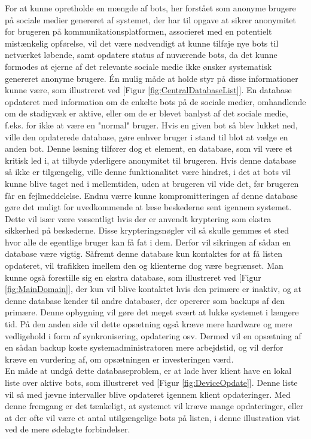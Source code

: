 For at kunne opretholde en mængde af bots, her forstået som anonyme brugere på sociale medier genereret af systemet, der har til opgave at sikrer anonymitet for brugeren på kommunikationsplatformen, associeret med en potentielt mistænkelig opførelse, vil det være nødvendigt at kunne tilføje nye bots til netværket løbende, samt opdatere status af nuværende bots, da det kunne formodes at ejerne af det relevante sociale medie ikke ønsker systematisk genereret anonyme brugere. Én mulig måde at holde styr på disse informationer kunne være, som illustreret ved [Figur \ref{fig:CentralDatabaseList}]. En database opdateret med information om de enkelte bots på de sociale medier, omhandlende om de stadigvæk er aktive, eller om de er blevet banlyst af det sociale medie, f.eks. for ikke at være en "normal" bruger. Hvis en given bot så blev lukket ned, ville den opdaterede database, gøre enhver bruger i stand til blot at vælge en anden bot. Denne løsning tilfører dog et element, en database, som vil være et kritisk led i, at tilbyde yderligere anonymitet til brugeren. Hvis denne database så ikke er tilgængelig, ville denne funktionalitet være hindret, i det at bots vil kunne blive taget ned i mellemtiden, uden at brugeren vil vide det, før brugeren får en fejlmeddelelse. Endnu værre kunne kompromitteringen af denne database gøre det muligt for uvedkommende at læse beskederne sent igennem systemet. Dette vil især være væsentligt hvis der er anvendt kryptering som ekstra sikkerhed på beskederne. Disse krypteringsnøgler vil så skulle gemmes et sted hvor alle de egentlige bruger kan få fat i dem. Derfor vil sikringen af sådan en database være vigtig. Såfremt denne database kun kontaktes for at få listen opdateret, vil trafikken imellem den og klienterne dog være begrænset. Man kunne også forestille sig en ekstra database, som illustreret ved [Figur \ref{fig:MainDomain}], der kun vil blive kontaktet hvis den primære er inaktiv, og at denne database kender til andre databaser, der opererer som backups af den primære. Denne opbygning vil gøre det meget svært at lukke systemet i længere tid. På den anden side vil dette opsætning også kræve mere hardware og mere vedligehold i form af synkronisering, opdatering osv. Dermed vil en opsætning af en sådan backup koste systemadministratoren mere arbejdstid, og vil derfor kræve en vurdering af, om opsætningen er investeringen værd.\\
En måde at undgå dette databaseproblem, er at lade hver klient have en lokal liste over aktive bots, som illustreret ved [Figur \ref{fig:DeviceOpdate}]. Denne liste vil så med jævne intervaller blive opdateret igennem klient opdateringer. Med denne fremgang er det tænkeligt, at systemet vil kræve mange opdateringer, eller at der ofte vil være et antal utilgængelige bots på listen, i denne illustration vist ved de mere ødelagte forbindelser.
